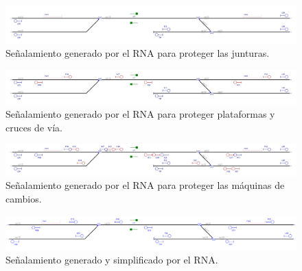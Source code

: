     \begin{figure}[h]
        \centering
        \includegraphics[width=1\textwidth]{resultados-obtenidos/ejemplo2/images/2_step2.png}
        \centering\caption{Señalamiento generado por el RNA para proteger las junturas.}
    \end{figure}

    \begin{figure}[h]
        \centering
        \includegraphics[width=1\textwidth]{resultados-obtenidos/ejemplo2/images/2_step3.png}
        \centering\caption{Señalamiento generado por el RNA para proteger plataformas y cruces de vía.}
    \end{figure}

    \begin{figure}[h]
        \centering
        \includegraphics[width=1\textwidth]{resultados-obtenidos/ejemplo2/images/2_step4.png}
        \centering\caption{Señalamiento generado por el RNA para proteger las máquinas de cambios.}
    \end{figure}

    \begin{figure}[h]
        \centering
        \includegraphics[width=1\textwidth]{resultados-obtenidos/ejemplo2/images/2_RNA.png}
        \centering\caption{Señalamiento generado y simplificado por el RNA.}
    \end{figure}
    
    
    
    
    